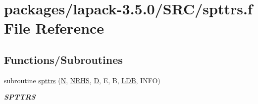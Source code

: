 \hypertarget{spttrs_8f}{}\section{packages/lapack-\/3.5.0/\+S\+R\+C/spttrs.f File Reference}
\label{spttrs_8f}
\subsection*{Functions/\+Subroutines}
\begin{DoxyCompactItemize}
\item 
subroutine \hyperlink{group__realPTcomputational_gad3d24a8e0bd3c2341bed389633536d94}{spttrs} (\hyperlink{polmisc_8c_a0240ac851181b84ac374872dc5434ee4}{N}, \hyperlink{example__user_8c_aa0138da002ce2a90360df2f521eb3198}{N\+R\+H\+S}, \hyperlink{odrpack_8h_a7dae6ea403d00f3687f24a874e67d139}{D}, E, B, \hyperlink{example__user_8c_a50e90a7104df172b5a89a06c47fcca04}{L\+D\+B}, I\+N\+F\+O)
\begin{DoxyCompactList}\small\item\em {\bfseries S\+P\+T\+T\+R\+S} \end{DoxyCompactList}\end{DoxyCompactItemize}
